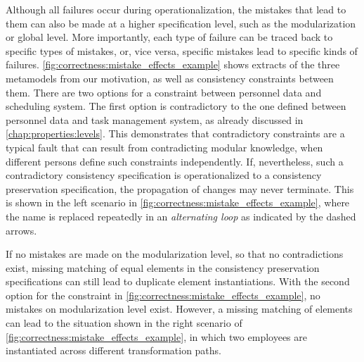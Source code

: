 Although all failures occur during operationalization, the mistakes that lead to them can also be made at a higher specification level, such as the modularization or global level.
More importantly, each type of failure can be traced back to specific types of mistakes, or, vice versa, specific mistakes lead to specific kinds of failures.
\autoref{fig:correctness:mistake_effects_example} shows extracts of the three metamodels from our motivation, as well as consistency constraints between them.
There are two options for a constraint between personnel data and scheduling system.
The first option is contradictory to the one defined between personnel data and task management system, as already discussed in \autoref{chap:properties:levels}.
This demonstrates that contradictory constraints are a typical fault that can result from contradicting modular knowledge, when different persons define such constraints independently.
If, nevertheless, such a contradictory consistency specification is operationalized to a consistency preservation specification, the propagation of changes may never terminate.
This is shown in the left scenario in \autoref{fig:correctness:mistake_effects_example}, where
the name is replaced repeatedly in an \emph{alternating loop} as indicated by the dashed arrows.

If no mistakes are made on the modularization level, so that no contradictions exist, %
missing matching of equal elements in the consistency preservation specifications can still lead to duplicate element instantiations.
With the second option for the constraint in \autoref{fig:correctness:mistake_effects_example}, %
no mistakes on modularization level exist.
However, a missing matching of elements %
can lead to the situation shown in the right scenario of \autoref{fig:correctness:mistake_effects_example}, in which two employees are instantiated across different transformation paths.


